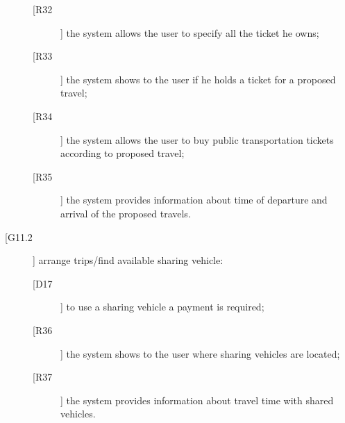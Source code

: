 \begin{description}
\begin{description}
	\newline
	\item[[R32]] the system allows the user to specify all the ticket he owns;
	\item[[R33]] the system shows to the user if he holds a ticket for a proposed travel;
	\item[[R34]] the system allows the user to buy public transportation tickets according to proposed travel;
	\item[[R35]] the system provides information about time of departure and arrival of the proposed travels.
	\end{description}
\item[[G11.2]] arrange trips/find available sharing vehicle:
	\begin{description}
	\item[[D17]] to use a sharing vehicle a payment is required;
	\item[[R36]] the system shows to the user where sharing vehicles are located;
	\item[[R37]] the system provides information about travel time with shared vehicles.
	\end{description}
\end{description}